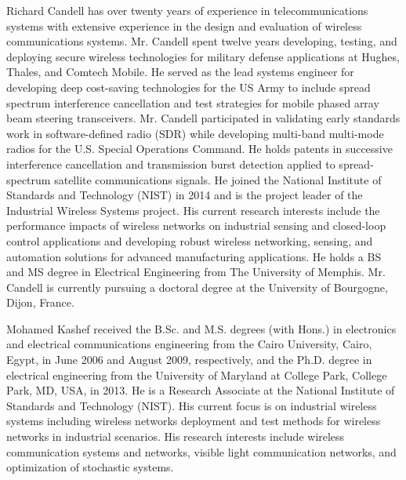 \documentclass[journal, twoside]{IEEEtran}
\begin{document}
	\begin{IEEEbiography}
		{Richard Candell} has over twenty years of experience in telecommunications systems with extensive experience in the design and evaluation of wireless communications systems.  Mr. Candell spent twelve years developing, testing, and deploying secure wireless technologies for military defense applications at Hughes, Thales, and Comtech Mobile. He served as the lead systems engineer for developing deep cost-saving technologies for the US Army to include spread spectrum interference cancellation and test strategies for mobile phased array beam steering transceivers.  Mr. Candell participated in validating early standards work in software-defined radio (SDR) while developing multi-band multi-mode radios for the U.S. Special Operations Command. He holds patents in successive interference cancellation and transmission burst detection applied to spread-spectrum satellite communications signals. He joined the National Institute of Standards and Technology (NIST) in 2014 and is the project leader of the Industrial Wireless Systems project. His current research interests include the performance impacts of wireless networks on industrial sensing and closed-loop control applications and developing robust wireless networking, sensing, and automation solutions for advanced manufacturing applications. He holds a BS and MS degree in Electrical Engineering from The University of Memphis. Mr. Candell is currently pursuing a doctoral degree at the University of Bourgogne, Dijon, France.
	\end{IEEEbiography}
	\begin{IEEEbiography}{Mohamed Kashef} received the B.Sc. and M.S. degrees (with Hons.) in electronics and electrical communications engineering from the Cairo University, Cairo, Egypt, in June 2006 and August 2009, respectively, and the Ph.D. degree in electrical engineering from the University of Maryland at College Park, College Park, MD, USA, in 2013. He is a Research Associate at the National Institute of Standards and Technology (NIST). His current focus is on industrial wireless systems including wireless networks deployment and test methods for wireless networks in industrial scenarios. His research interests include wireless communication systems and networks, visible light communication networks, and optimization of stochastic systems.
	\end{IEEEbiography}
\end{document}
